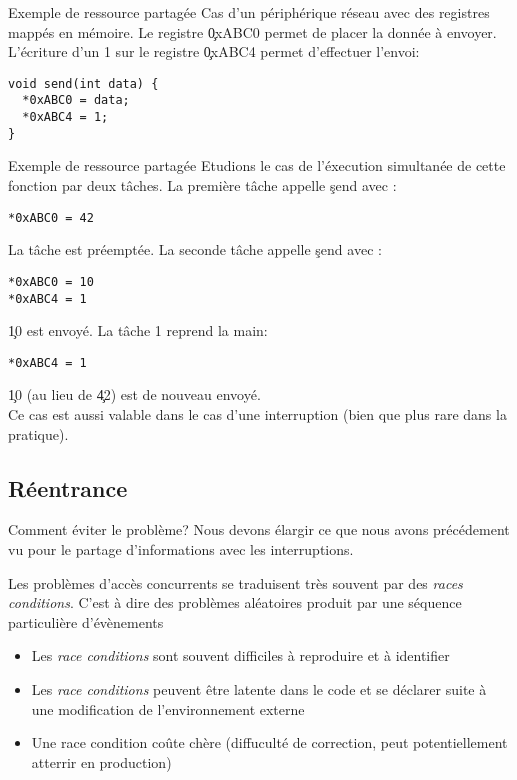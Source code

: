 \begin{frame}[fragile]{Exemple de ressource partagée}
  Cas d'un  périphérique réseau avec des registres  mappés en mémoire.
  Le  registre  \c{0xABC0}  permet  de  placer la  donnée  à  envoyer.
  L'écriture  d'un 1  sur  le registre  \c{0xABC4} permet  d'effectuer
  l'envoi:
\begin{lstlisting} 
void send(int data) {
  *0xABC0 = data;
  *0xABC4 = 1;
}
  \end{lstlisting} 
\end{frame} 

\begin{frame}[fragile]{Exemple de ressource partagée}
  Etudions le cas de l'éxecution simultanée de cette fonction par deux
  tâches.  La première tâche appelle \c{send} avec :
  \begin{lstlisting} 
*0xABC0 = 42
  \end{lstlisting} 
  La  tâche est  préemptée.  La  seconde tâche  appelle  \c{send} avec
  :
\begin{lstlisting} 
*0xABC0 = 10
*0xABC4 = 1
\end{lstlisting} 
  \c{10} est envoyé. La tâche 1 reprend la main:
\begin{lstlisting} 
*0xABC4 = 1
\end{lstlisting} 
  \c{10} (au lieu de \c{42}) est de nouveau envoyé.\\[3mm]

  Ce cas  est aussi valable dans  le cas d'une  interruption (bien que
  plus rare dans la pratique).
\end{frame} 

\subsection{Réentrance}

\begin{frame}{Comment éviter le problème?}
  Nous devons élargir ce que nous avons précédement vu pour le partage
  d'informations avec les interruptions.

  Les problèmes d'accès concurrents se traduisent très souvent par des
  \emph{races  conditions}.   C'est à  dire  des problèmes  aléatoires
  produit par une séquence particulière d'évènements
  \begin{itemize} 
  \item   Les  \emph{race  conditions}   sont  souvent   difficiles  à
    reproduire et à identifier
  \item Les  \emph{race conditions} peuvent être latente  dans le code
    et se déclarer suite à une modification de l'environnement externe
  \item Une race condition coûte chère (diffuculté de correction, peut
    potentiellement atterrir en production)
  \end{itemize} 
\end{frame}

